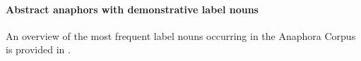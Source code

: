 \documentclass[output=paper]{LSP/langsci}
\begin{document}















\paragraph*{Abstract anaphors with demonstrative label nouns}

An overview of the most frequent label nouns occurring in the Anaphora Corpus is provided in . 
\end{document}
